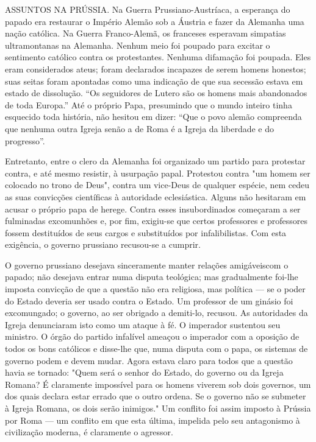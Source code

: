 \documentclass[11pt,a5paper,twoside,openany]{book}
\begin{document}
ASSUNTOS NA PRÚSSIA. Na Guerra Prussiano-Austríaca, a esperança do papado era restaurar o Império Alemão sob a Áustria e fazer da Alemanha uma nação católica. Na Guerra Franco-Alemã, os franceses esperavam simpatias ultramontanas na Alemanha. Nenhum meio foi poupado para excitar o sentimento católico contra os protestantes. Nenhuma difamação foi poupada. Eles eram considerados ateus; foram declarados incapazes de serem homens honestos; suas seitas foram apontadas como uma indicação de que sua secessão estava em estado de dissolução. “Os seguidores de Lutero são os homens mais abandonados de toda Europa.” Até o próprio Papa, presumindo que o mundo inteiro tinha esquecido toda história, não hesitou em dizer: “Que o povo alemão compreenda que nenhuma outra Igreja senão a de Roma é a Igreja da liberdade e do progresso”.

Entretanto, entre o clero da Alemanha foi organizado um partido para protestar contra, e até mesmo resistir, à usurpação papal. Protestou contra "um homem ser colocado no trono de Deus", contra um vice-Deus de qualquer espécie, nem cedeu as suas convicções científicas à autoridade eclesiástica. Alguns não hesitaram em acusar o próprio papa de herege. Contra esses insubordinados começaram a ser fulminadas excomunhões e, por fim, exigiu-se que certos professores e professores fossem destituídos de seus cargos e substituídos por infalibilistas. Com esta exigência, o governo prussiano recusou-se a cumprir.

O governo prussiano desejava sinceramente manter relações amigáveis ​​com o papado; não desejava entrar numa disputa teológica; mas gradualmente foi-lhe imposta convicção de que a questão não era religiosa, mas política — se o poder do Estado deveria ser usado contra o Estado. Um professor de um ginásio foi excomungado; o governo, ao ser obrigado a demiti-lo, recusou. As autoridades da Igreja denunciaram isto como um ataque à fé. O imperador sustentou seu ministro. O órgão do partido infalível ameaçou o imperador com a oposição de todos os bons católicos e disse-lhe que, numa disputa com o papa, os sistemas de governo podem e devem mudar. Agora estava claro para todos que a questão havia se tornado: "Quem será o senhor do Estado, do governo ou da Igreja Romana? É claramente impossível para os homens viverem sob dois governos, um dos quais declara estar errado que o outro ordena. Se o governo não se submeter à Igreja Romana, os dois serão inimigos." Um conflito foi assim imposto à Prússia por Roma — um conflito em que esta última, impelida pelo seu antagonismo à civilização moderna, é claramente o agressor.
\end{document}
